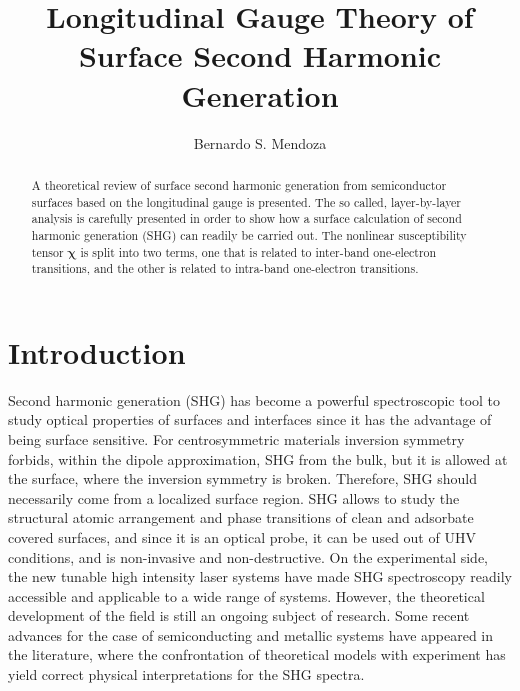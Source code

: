 \documentclass[floatfix,prb,aps,superscriptaddress,11pt,preprint]{revtex4}
\begin{document}
\title{Longitudinal Gauge Theory of Surface 
Second Harmonic Generation}

\author{Bernardo S. Mendoza}

\begin{abstract}
A theoretical review of surface second harmonic generation
from semiconductor surfaces based on the longitudinal gauge is
presented.
The so called, layer-by-layer analysis is carefully presented in order
to show how a surface calculation of second harmonic generation (SHG)
can readily be carried out.
The nonlinear susceptibility tensor $\boldsymbol{\chi}$ is split into two terms, one that
is related to inter-band one-electron transitions, and the other is related
to intra-band one-electron transitions. 
\end{abstract}
\maketitle
\tableofcontents

\section{Introduction}\label{intro}

Second harmonic generation (SHG) has
become a powerful spectroscopic  tool to study optical properties of
surfaces and interfaces since it has
the advantage of being surface sensitive.
For centrosymmetric materials
inversion symmetry
forbids, within the dipole approximation, SHG from the bulk, but
it is allowed at the surface, where the inversion symmetry is broken.
Therefore,
SHG should necessarily come from a localized surface region.
SHG allows to study the structural
atomic arrangement and phase transitions of clean and adsorbate
covered surfaces, and since it is an optical probe, it can be used out of
UHV conditions, and is non-invasive and non-destructive.
On the experimental side, the
new tunable high intensity laser systems have made SHG spectroscopy readily
accessible and applicable to a wide range of
systems.\cite{downer01}
However, the theoretical
development of the field is still an ongoing subject of research.
Some recent advances for the case of  semiconducting
and metallic systems have
appeared in the literature, where the confrontation of theoretical
models with experiment has
yield correct physical interpretations for the SHG
spectra.
\cite{downer01,mendoza01a,lim00,gav00,mendoza99,mendoza98a,mendoza96,guyot90}
\end{document}
